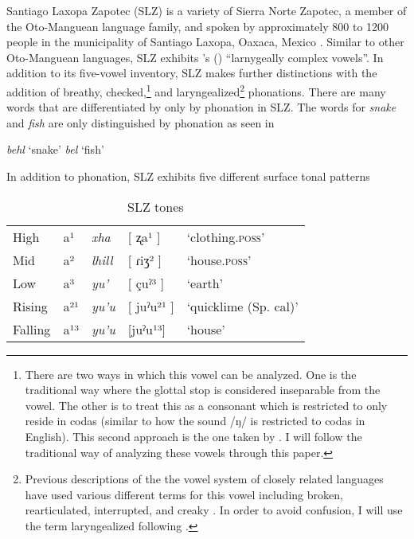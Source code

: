 \documentclass[12pt, letterpaper]{article}
\providecommand{\lsptoprule}{\midrule\toprule}
\providecommand{\lspbottomrule}{\bottomrule\midrule}
\begin{document}
Santiago Laxopa Zapotec (SLZ) is a variety of Sierra Norte Zapotec, a member of the Oto-Manguean language family, and spoken by approximately 800 to 1200 people in the municipality of Santiago Laxopa, Oaxaca, Mexico \citep{adlerDerivationVerbInitiality2018,sichelPronounsAttractionSierra2020}. Similar to other Oto-Manguean languages, SLZ exhibits \citeauthor{silvermanLaryngealComplexityOtomanguean1997}'s (\citeyear{silvermanLaryngealComplexityOtomanguean1997}) ``larnygeally complex vowels''. In addition to its five-vowel inventory, SLZ makes further distinctions with the addition of breathy, checked,\footnote{There are two ways in which this vowel can be analyzed. One is the traditional way where the glottal stop is considered inseparable from the vowel. The other is to treat this as a consonant which is restricted to only reside in codas (similar to how the sound /ŋ/ is restricted to codas in English). This second approach is the one taken by \citet{avelinobecerraTopicsYalalagZapotec2004}. I will follow the traditional way of analyzing these vowels through this paper.} and laryngealized\footnote{Previous descriptions of the the vowel system of closely related languages have used various different terms for this vowel including broken, rearticulated, interrupted, and creaky \citep{longDiccionarioZapotecoSan2005,avelinoAcousticElectroglottographicAnalyses2010,avelinobecerraTopicsYalalagZapotec2004,sonnenscheinDescriptiveGrammarSan2005,adlerAcousticsPhonationTypes2016}. In order to avoid confusion, I will use the term laryngealized following \citet{avelinoAcousticElectroglottographicAnalyses2010}.} phonations. There are many words that are differentiated by only by phonation in SLZ. The words for \emph{snake} and \emph{fish} are only distinguished by phonation as seen in

\ea
	\ea \textit{behl} `snake'
	\ex \textit{bel} `fish'
	\z  
\z 
	



In addition to phonation, SLZ exhibits five different surface tonal patterns 

\begin{table}[!h]
\centering
\caption{SLZ tones}
\label{tab:tones}
 \begin{tabular}{lllll}
  \lsptoprule
  High   	&  a¹  &  \textit{xha}   &  [ ʐa¹ ] & `clothing.\textsc{poss}'\\
	Mid    	&  a²  &  \textit{lhill} 	& [ ɾiʒ² ] & `house.\textsc{poss}' \\
	Low   	&  a³  &  \textit{yu'} 	&	 [ çuˀ³ ] & `earth'\\
	Rising	&  a²¹  &  \textit{yu'u} 	&	[ juˀu²¹ ] & `quicklime (Sp. cal)' \\
	Falling &  a¹³  &  \textit{yu'u}  &	[juˀu¹³] &	`house' \\
  \lspbottomrule
 \end{tabular}
\end{table}
\end{document}
